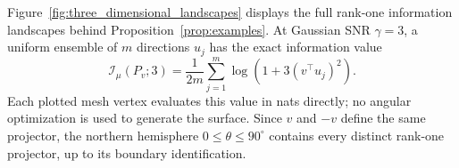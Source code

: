 \documentclass[lettersize,onecolumn]{IEEEtran}
\theoremstyle{remark}
\theoremstyle{definition}
\newcommand{\I}{\mathcal I}
\begin{document}
Figure~\ref{fig:three_dimensional_landscapes} displays the full rank-one
information landscapes behind Proposition~\ref{prop:examples}. At Gaussian SNR $\gamma=3$, a uniform ensemble of
$m$ directions $u_j$ has the exact information value
\begin{equation}
\I_\mu(P_v;3)=\frac{1}{2m}\sum_{j=1}^{m}
\log\!\left(1+3(v^\top u_j)^2\right).
\label{eq:three_dimensional_surface}
\end{equation}
Each plotted mesh vertex evaluates this value in nats directly; no angular
optimization is used to generate the surface. Since $v$ and $-v$
define the same projector, the northern hemisphere $0\le\theta\le90^\circ$
contains every distinct rank-one projector, up to its boundary identification.
\end{document}
